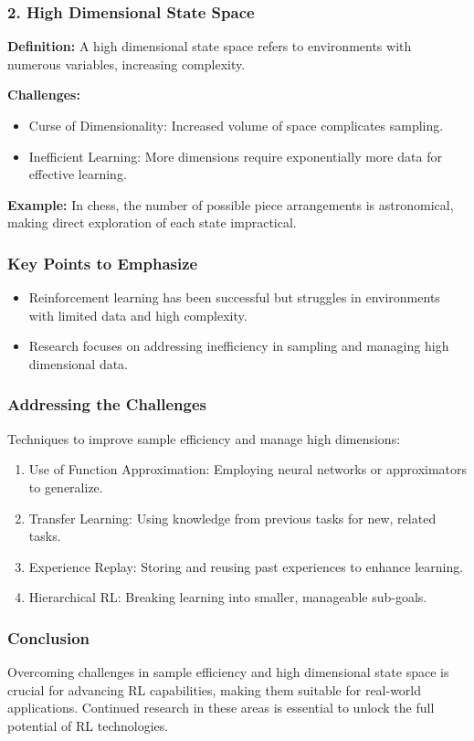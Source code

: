 \documentclass{beamer}
\begin{document}
\begin{frame}[fragile]
    \frametitle{2. High Dimensional State Space}
    \textbf{Definition:} A high dimensional state space refers to environments with numerous variables, increasing complexity.

    \textbf{Challenges:}
    \begin{itemize}
        \item Curse of Dimensionality: Increased volume of space complicates sampling.
        \item Inefficient Learning: More dimensions require exponentially more data for effective learning.
    \end{itemize}

    \textbf{Example:} 
    In chess, the number of possible piece arrangements is astronomical, making direct exploration of each state impractical.
\end{frame}

\begin{frame}[fragile]
    \frametitle{Key Points to Emphasize}
    \begin{itemize}
        \item Reinforcement learning has been successful but struggles in environments with limited data and high complexity.
        \item Research focuses on addressing inefficiency in sampling and managing high dimensional data.
    \end{itemize}
\end{frame}

\begin{frame}[fragile]
    \frametitle{Addressing the Challenges}
    Techniques to improve sample efficiency and manage high dimensions:
    
    \begin{enumerate}
        \item Use of Function Approximation: Employing neural networks or approximators to generalize.
        \item Transfer Learning: Using knowledge from previous tasks for new, related tasks.
        \item Experience Replay: Storing and reusing past experiences to enhance learning.
        \item Hierarchical RL: Breaking learning into smaller, manageable sub-goals.
    \end{enumerate}
\end{frame}

\begin{frame}[fragile]
    \frametitle{Conclusion}
    Overcoming challenges in sample efficiency and high dimensional state space is crucial for advancing RL capabilities, making them suitable for real-world applications. Continued research in these areas is essential to unlock the full potential of RL technologies.
\end{frame}
\end{document}

